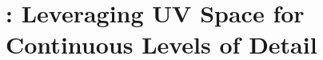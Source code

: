 \chapter{\clog: Leveraging UV Space for Continuous Levels of Detail}
\label{chap:clog}


\clogteaserfigure








